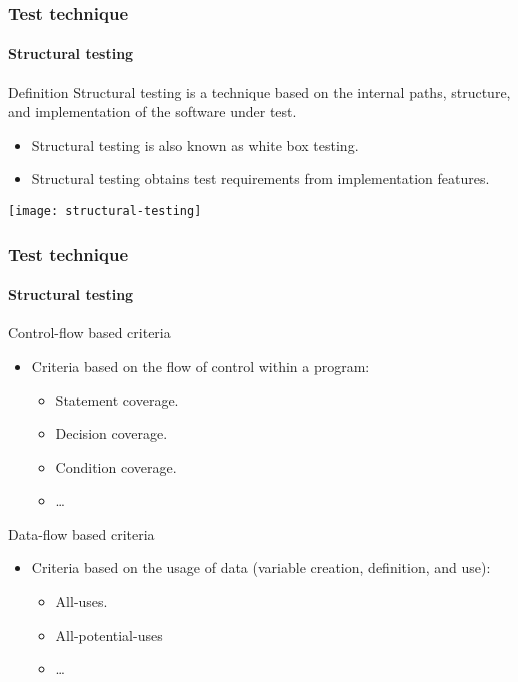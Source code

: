 \begin{frame}
\frametitle{Test technique}
\framesubtitle{Structural testing}

\begin{block:concept}{Definition}
Structural testing is a technique based on the internal paths, structure,
and implementation of the software under test.
\end{block:concept}


\begin{block:fact}{}
\begin{itemize}
	\item Structural testing is also known as white box testing.

	\item Structural testing obtains test requirements from implementation
	features.
\end{itemize}
\end{block:fact}

\begin{block:fact}{}
    \centering
    \texttt{[image: structural-testing]}
\end{block:fact}
\end{frame}


\begin{frame}
\frametitle{Test technique}
\framesubtitle{Structural testing}
\label{concept:structural-testing-criteria}

\begin{block:fact}{Control-flow based criteria}
\begin{itemize}
	\item Criteria based on the flow of control within a program:
	\begin{itemize}
		\item Statement coverage.
		\item Decision coverage.
		\item Condition coverage.
		\item \ldots
	\end{itemize}
\end{itemize}
\end{block:fact}


\begin{block:fact}{Data-flow based criteria}
\begin{itemize}
	\item Criteria based on the usage of data (variable creation, definition,
	and use):
	\begin{itemize}
		\item All-uses.
		\item All-potential-uses
		\item \ldots
	\end{itemize}
\end{itemize}
\end{block:fact}


\hfill
{}
\end{frame}




